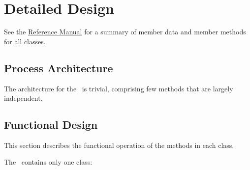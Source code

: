 
%
%
% 
%

\section{Detailed Design}
See the \href{file:refman.pdf}{Reference Manual}\cite{derivedstatebib:ReferenceManual} for a summary of member data and member methods for all classes.  

\subsection{Process Architecture}
The architecture for the \OrbElemDesc\ is trivial, comprising few methods that are largely independent.

\subsection{Functional Design}
This section describes the functional operation of the methods in each class.

The \OrbElemDesc\ contains only one class:

